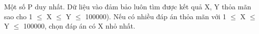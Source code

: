 Một số P duy nhất. Dữ liệu vào đảm bảo luôn tìm được kết quả X, Y thỏa mãn sao cho 1  $\le$  X  $\le$  Y  $\le$  100000). Nếu có nhiều đáp án thỏa mãn với 1  $\le$  X  $\le$  Y  $\le$  100000, chọn đáp án có X nhỏ nhất.  

\